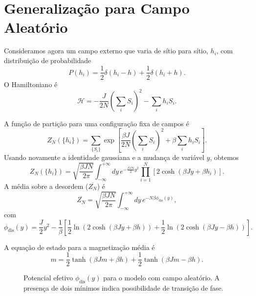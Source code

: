 \documentclass[12pt]{article}
\begin{document}
\section{Generalização para Campo Aleatório}

Consideramos agora um campo externo que varia de sítio para sítio, $h_i$, com distribuição de probabilidade
\begin{equation}
    P(h_i) = \frac{1}{2} \delta(h_i - h) + \frac{1}{2} \delta(h_i + h).
\end{equation}
O Hamiltoniano é
\begin{equation}
    \mathcal{H} = -\frac{J}{2N} \left( \sum_i S_i \right)^2 - \sum_i h_i S_i.
\end{equation}

A função de partição para uma configuração fixa de campos é
\begin{equation}
    Z_N(\{h_i\}) = \sum_{\{S_i\}} \exp\left[ \frac{\beta J}{2N} \left( \sum_i S_i \right)^2 + \beta \sum_i h_i S_i \right].
\end{equation}
Usando novamente a identidade gaussiana e a mudança de variável $y$, obtemos
\begin{equation}
    Z_N(\{h_i\}) = \sqrt{\frac{\beta J N}{2\pi}} \int_{-\infty}^{+\infty} dy \, e^{-\frac{\beta J N}{2} y^2} \prod_{i=1}^N \left[ 2 \cosh\left( \beta J y + \beta h_i \right) \right].
\end{equation}
A média sobre a desordem ($\overline{Z_N}$) é
\begin{equation}
    \overline{Z_N} = \sqrt{\frac{\beta J N}{2\pi}} \int_{-\infty}^{+\infty} dy \, e^{-N \beta \phi_{\text{dis}}(y)},
\end{equation}
com
\begin{equation}
    \phi_{\text{dis}}(y) = \frac{J}{2} y^2 - \frac{1}{\beta} \left[ \frac{1}{2} \ln\left( 2 \cosh(\beta J y + \beta h) \right) + \frac{1}{2} \ln\left( 2 \cosh(\beta J y - \beta h) \right) \right].
\end{equation}

A equação de estado para a magnetização média é
\begin{equation}
    m = \frac{1}{2} \tanh( \beta J m + \beta h ) + \frac{1}{2} \tanh( \beta J m - \beta h ).
\end{equation}

\begin{figure}[h]
\centering
{}
\caption{Potencial efetivo $\phi_{\text{dis}}(y)$ para o modelo com campo aleatório. A presença de dois mínimos indica possibilidade de transição de fase.}
\end{figure}
\end{document}
